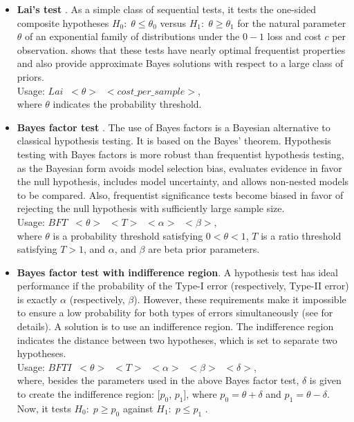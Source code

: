 \begin{itemize}

\item {\bf Lai's test} \cite{lai1988nearly}.
As a simple class of sequential tests, it tests the one-sided composite hypotheses $H_0: \; \theta \leq \theta_0$ versus $H_1:\; \theta \geq \theta_1$ for the natural parameter $\theta$ of an exponential family of distributions under the $0-1$ loss and cost $c$ per observation. \cite{lai1988nearly} shows that these tests have nearly optimal frequentist properties and also provide approximate Bayes solutions with respect to a large class of priors. \\
Usage: $Lai\;\; <\theta>\;\; <cost\_per\_ sample>$,\\
where $\theta$ indicates the probability threshold.\\

\item {\bf Bayes factor test} \cite{kass1995bayes}.
The use of Bayes factors is a Bayesian alternative to classical hypothesis testing. It is based on the Bayes' theorem. Hypothesis testing with Bayes factors is more robust than frequentist hypothesis testing, as the Bayesian form avoids model selection bias, evaluates evidence in favor the null hypothesis, includes model uncertainty, and allows non-nested models to be compared. Also, frequentist significance tests become biased in favor of rejecting the null hypothesis with sufficiently large sample size. \\
Usage: $BFT\;\; <\theta>\;\; <T> \;\;<\alpha> \;\;<\beta>$,\\
where $\theta$ is a probability threshold satisfying $0 < \theta < 1$, $T$ is a ratio threshold satisfying $T > 1$, and $\alpha$, and $\beta$ are beta prior parameters.\\

\item {\bf Bayes factor test with indifference region}. 
A hypothesis test has ideal performance if the probability of the Type-I error (respectively, Type-II error) is exactly $\alpha$ (respectively, $\beta$). However, these requirements make it impossible to ensure a low probability for both types of errors simultaneously (see \cite{younes2005verification} for details). A solution is to use an indifference region. The indifference region indicates the distance between two hypotheses, which is set to separate two hypotheses.\\
Usage: $BFTI \;\;<\theta> \;\;<T>\;\; <\alpha> \;\;<\beta> \;\;<\delta>$,\\
where, besides the parameters used in the above Bayes factor test, $\delta$ is given to create the indifference region: [$p_0$, $p_1$], where $p_0 = \theta + \delta$ and $p_1 = \theta  - \delta$.  Now, it tests $H_0 :\; p \ge p_0$ against $H_1:\; p \le p_1$ .\\


\end{itemize}
